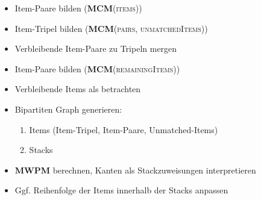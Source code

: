 \begin{itemize}
  \item Item-Paare bilden (\textsc{\textbf{MCM}(items)})
  \item Item-Tripel bilden (\textsc{\textbf{MCM}(pairs, unmatchedItems)})
  \item Verbleibende Item-Paare zu Tripeln mergen
  \item Item-Paare bilden (\textsc{\textbf{MCM}(remainingItems)})
  \item Verbleibende Items als  betrachten
  \item Bipartiten Graph generieren:
  \begin{enumerate}
    \item Items (Item-Tripel, Item-Paare, Unmatched-Items)
    \item Stacks
  \end{enumerate}
  \item \textsc{\textbf{MWPM}} berechnen, Kanten als Stackzuweisungen interpretieren
  \item Ggf. Reihenfolge der Items innerhalb der Stacks anpassen
\end{itemize}

\pagebreak


